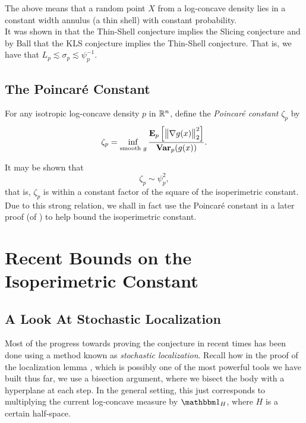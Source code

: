 \documentclass{article}
\begin{document}
		The above means that a random point $X$ from a log-concave density lies in a constant width annulus (a thin shell) with constant probability.\\

		It was shown in \cite{Eldan2010ApproximatelyGM} that the Thin-Shell conjecture implies the Slicing conjecture and by Ball that the KLS conjecture implies the Thin-Shell conjecture. That is, we have that $L_p \lesssim \sigma_p \lesssim \psi_p^{-1}$.

	\subsection{The Poincar\'{e} Constant}
		\label{sec: poincare constant}

		\begin{fdef}
			For any isotropic log-concave density $p$ in $\mathbb{R}^n$, define the \textit{Poincar\'{e} constant} $\zeta_p$ by
			\[ \zeta_p = \inf_{\text{smooth $g$}} \frac{ \textbf{E}_p \left[\left\lVert\nabla g(x) \right\rVert_2^2\right] }{ \operatorname{\textbf{Var}}_p (g(x)) }. \]
		\end{fdef}

		It may be shown that
		\[ \zeta_p \sim \psi_p^2, \]
		that is, $\zeta_p$ is within a constant factor of the square of the isoperimetric constant. Due to this strong relation, we shall in fact use the Poincar\'{e} constant in a later proof (of ) to help bound the isoperimetric constant.

\clearpage

\section{Recent Bounds on the Isoperimetric Constant}

	\subsection{A Look At Stochastic Localization}


		Most of the progress towards proving the conjecture in recent times has been done using a method known as \textit{stochastic localization}. Recall how in the proof of the localization lemma , which is possibly one of the most powerful tools we have built thus far, we use a bisection argument, where we bisect the body with a hyperplane at each step. In the general setting, this just corresponds to multiplying the current log-concave measure by $\indic_{H}$, where $H$ is a certain half-space.\\
\end{document}
